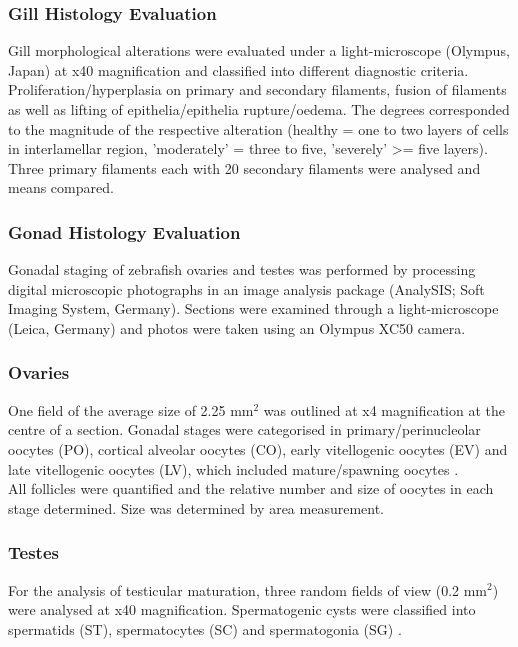 \documentclass[twoside]{article}
\begin{document}
\begin{multicols}{2}
\subsubsection{Gill Histology Evaluation}
Gill morphological alterations were evaluated under a light-microscope (Olympus, Japan) at x40 magnification and classified into different diagnostic criteria. Proliferation/hyperplasia  on primary and secondary filaments, fusion of filaments as well as lifting of epithelia/epithelia rupture/oedema. 
The degrees corresponded to the magnitude of the respective alteration (healthy = one to two layers of cells in interlamellar region, 'moderately' = three to five, 'severely' >= five layers). Three primary filaments each with 20 secondary filaments were analysed and means compared.

\subsubsection{Gonad Histology Evaluation}
Gonadal staging of zebrafish ovaries and testes was performed by processing digital microscopic photographs in an image analysis package (AnalySIS; Soft Imaging System, Germany). Sections were examined through a light-microscope (Leica, Germany) and photos were taken using an Olympus XC50 camera. 

\subsubsection{Ovaries}
One field of the average size of 2.25 mm$^2$ was outlined at x4 magnification at the centre of a section.
Gonadal stages were categorised in primary/perinucleolar oocytes (PO), cortical alveolar oocytes (CO), early vitellogenic oocytes (EV) and late vitellogenic oocytes (LV), which included mature/spawning oocytes \citep{Johnson2009}. \\
All follicles were quantified and the relative number and size of oocytes in each stage determined. Size was determined by area measurement.



\subsubsection{Testes}
For the analysis of testicular maturation, three random fields of view (0.2 mm$^2$) were analysed at x40 magnification. Spermatogenic cysts were classified into spermatids (ST), spermatocytes (SC) and spermatogonia (SG) \citep{Johnson2009}.



\end{multicols}
\end{document}
